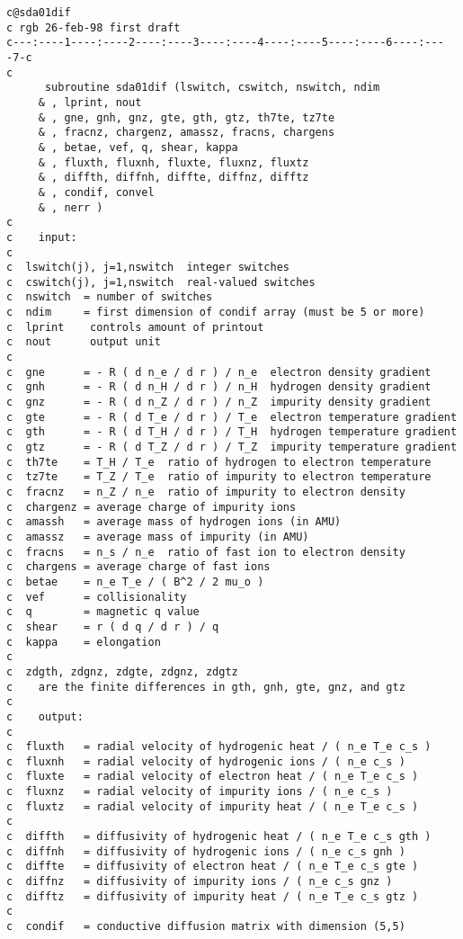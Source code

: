 \begin{verbatim}
c@sda01dif
c rgb 26-feb-98 first draft
c---:----1----:----2----:----3----:----4----:----5----:----6----:----7-c
c
      subroutine sda01dif (lswitch, cswitch, nswitch, ndim
     & , lprint, nout
     & , gne, gnh, gnz, gte, gth, gtz, th7te, tz7te
     & , fracnz, chargenz, amassz, fracns, chargens
     & , betae, vef, q, shear, kappa
     & , fluxth, fluxnh, fluxte, fluxnz, fluxtz
     & , diffth, diffnh, diffte, diffnz, difftz
     & , condif, convel
     & , nerr )
c
c    input:
c
c  lswitch(j), j=1,nswitch  integer switches
c  cswitch(j), j=1,nswitch  real-valued switches
c  nswitch  = number of switches
c  ndim     = first dimension of condif array (must be 5 or more)
c  lprint    controls amount of printout
c  nout      output unit
c
c  gne      = - R ( d n_e / d r ) / n_e  electron density gradient
c  gnh      = - R ( d n_H / d r ) / n_H  hydrogen density gradient
c  gnz      = - R ( d n_Z / d r ) / n_Z  impurity density gradient
c  gte      = - R ( d T_e / d r ) / T_e  electron temperature gradient
c  gth      = - R ( d T_H / d r ) / T_H  hydrogen temperature gradient
c  gtz      = - R ( d T_Z / d r ) / T_Z  impurity temperature gradient
c  th7te    = T_H / T_e  ratio of hydrogen to electron temperature
c  tz7te    = T_Z / T_e  ratio of impurity to electron temperature
c  fracnz   = n_Z / n_e  ratio of impurity to electron density
c  chargenz = average charge of impurity ions
c  amassh   = average mass of hydrogen ions (in AMU)
c  amassz   = average mass of impurity (in AMU)
c  fracns   = n_s / n_e  ratio of fast ion to electron density
c  chargens = average charge of fast ions
c  betae    = n_e T_e / ( B^2 / 2 mu_o )
c  vef      = collisionality
c  q        = magnetic q value
c  shear    = r ( d q / d r ) / q
c  kappa    = elongation
c
c  zdgth, zdgnz, zdgte, zdgnz, zdgtz
c    are the finite differences in gth, gnh, gte, gnz, and gtz
c
c    output:
c
c  fluxth   = radial velocity of hydrogenic heat / ( n_e T_e c_s )
c  fluxnh   = radial velocity of hydrogenic ions / ( n_e c_s )
c  fluxte   = radial velocity of electron heat / ( n_e T_e c_s )
c  fluxnz   = radial velocity of impurity ions / ( n_e c_s )
c  fluxtz   = radial velocity of impurity heat / ( n_e T_e c_s )
c
c  diffth   = diffusivity of hydrogenic heat / ( n_e T_e c_s gth )
c  diffnh   = diffusivity of hydrogenic ions / ( n_e c_s gnh )
c  diffte   = diffusivity of electron heat / ( n_e T_e c_s gte )
c  diffnz   = diffusivity of impurity ions / ( n_e c_s gnz )
c  difftz   = diffusivity of impurity heat / ( n_e T_e c_s gtz )
c
c  condif   = conductive diffusion matrix with dimension (5,5)

\end{verbatim}
